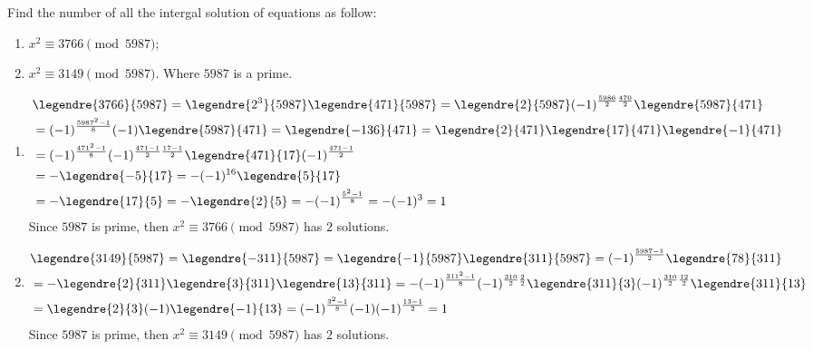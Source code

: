 \documentclass{ctexart}
\newif\ifpreface
\begin{document}
\large
\setlength{\baselineskip}{1.2em}
\ifpreface

\else
{}
\begin{problem}\label{pro:1}
  Find the number of all the intergal solution of equations as follow:
  \begin{enumerate}
    \item \(x^2 \equiv 3766 \pmod{5987}\);
    \item \(x^2 \equiv 3149 \pmod{5987}\).
      Where \(5987\) is a prime.
  \end{enumerate}
\end{problem}
\begin{solution}
  \begin{enumerate}
    \item
      \begin{equation}
        \begin{aligned}
           & \legendre{3766}{5987}=\legendre{2^3}{5987}\legendre{471}{5987}=\legendre{2}{5987}(-1)^{\frac{5986}{2} \frac{470}{2}}\legendre{5987}{471} \\
           & =(-1)^{\frac{5987^2-1}{8}} (-1)\legendre{5987}{471}=\legendre{-136}{471}=\legendre{2}{471}\legendre{17}{471}\legendre{-1}{471}           \\
           & =(-1)^{\frac{471^2-1}{8}}(-1)^{\frac{471-1}{2} \frac{17-1}{2}}\legendre{471}{17}(-1)^{\frac{471-1}{2}}                                   \\
           & =-\legendre{-5}{17}=-(-1)^{16}\legendre{5}{17}                                                                                           \\
           & =-\legendre{17}{5}=-\legendre{2}{5}=-(-1)^{\frac{5^2-1}{8}}=-(-1)^3=1
        \end{aligned}
      \end{equation}
      Since \(5987\) is prime, then \(x^2 \equiv 3766 \pmod{5987}\) has \(2\) solutions.
    \item
      \begin{equation}
        \begin{aligned}
           & \legendre{3149}{5987}=\legendre{-311}{5987}=\legendre{-1}{5987}\legendre{311}{5987}=(-1)^{\frac{5987-1}{2}}\legendre{78}{311}                                                        \\
           & =-\legendre{2}{311}\legendre{3}{311}\legendre{13}{311}=-(-1)^{\frac{311^2-1}{8}}(-1)^{\frac{310}{2} \frac{2}{2}}\legendre{311}{3}(-1)^{\frac{310}{2} \frac{12}{2}}\legendre{311}{13} \\
           & =\legendre{2}{3}(-1)\legendre{-1}{13}=(-1)^{\frac{3^2-1}{8}}(-1)(-1)^{\frac{13-1}{2}}=1
        \end{aligned}
      \end{equation}
      Since \(5987\) is prime, then \(x^2 \equiv 3149 \pmod{5987}\) has \(2\) solutions.
  \end{enumerate}
\end{solution}
\end{document}
